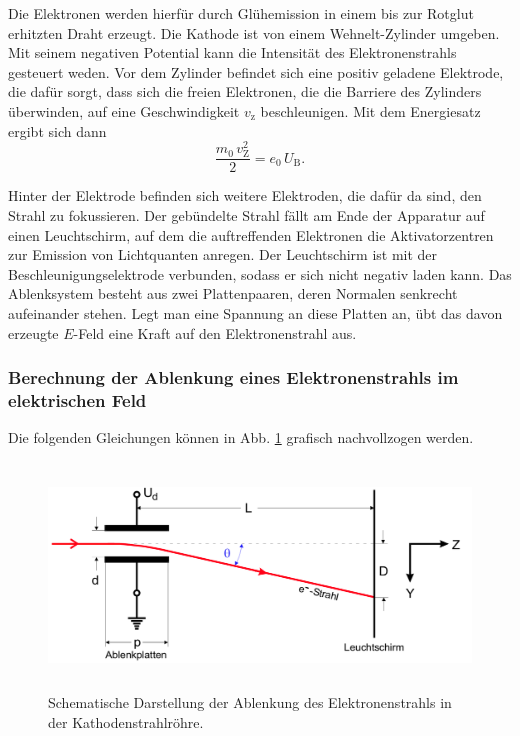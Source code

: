 \noindent Die Elektronen werden hierfür durch Glühemission in einem bis zur 
Rotglut erhitzten Draht erzeugt. 
Die Kathode ist von einem Wehnelt-Zylinder umgeben. Mit 
seinem negativen Potential kann die Intensität 
des Elektronenstrahls gesteuert weden. 
Vor dem Zylinder befindet sich eine positiv geladene 
Elektrode, die dafür sorgt, dass sich die freien Elektronen, 
die die Barriere des Zylinders überwinden, auf eine 
Geschwindigkeit $v_\text{z}$ beschleunigen. 
Mit dem Energiesatz ergibt sich dann 
\begin{equation}
    \frac{m_0 \, v_\text{Z}^2}{2} = e_\text{0} \, U_\text{B}.
    \label{eqn:energie}
\end{equation}

\noindent Hinter der Elektrode befinden sich weitere Elektroden, 
die dafür da sind, den Strahl zu fokussieren. Der gebündelte 
Strahl fällt am Ende der Apparatur auf einen Leuchtschirm, 
auf dem die auftreffenden Elektronen die Aktivatorzentren zur 
Emission von Lichtquanten anregen.
Der Leuchtschirm ist mit der Beschleunigungselektrode 
verbunden, sodass er sich nicht negativ laden kann.
Das Ablenksystem besteht aus zwei Plattenpaaren, deren Normalen 
senkrecht aufeinander stehen. Legt man eine Spannung an diese 
Platten an, übt das davon erzeugte $E$-Feld eine Kraft 
auf den Elektronenstrahl aus. 

\subsubsection{Berechnung der Ablenkung eines Elektronenstrahls im elektrischen Feld} %
Die folgenden Gleichungen können in Abb. \ref{fig:roehre2}
grafisch nachvollzogen werden.
\begin{figure}
    \centering
    \includegraphics[width=12cm, height=6cm]{build/roehre2.png}
    \caption{Schematische Darstellung der Ablenkung des
    Elektronenstrahls in der Kathodenstrahlröhre. \cite{V501}}
    \label{fig:roehre2}
\end{figure}

